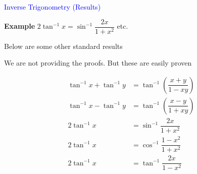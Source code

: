\documentclass[14pt,fleqn]{extarticle}
\begin{document}
\begin{skill}
\begin{narrow}
\textcolor{blue}{Inverse Trigonometry (Results)} 

\small\textbf{Example } $2\tan^{-1} x = \sin^{-1}\dfrac{2x}{1+x^2}$ etc. 
\end{narrow}

\reason 

Below are some other standard
results\newline 

We are not providing the
proofs. But these are easily 
proven

%
\begin{align}
\tan^{-1}x + \tan^{-1}y &= \tan^{-1}\left( \dfrac{x+y}{1-xy}\right) \\
\tan^{-1}x - \tan^{-1}y &= \tan^{-1}\left( \dfrac{x-y}{1+xy}\right) \\
2\tan^{-1} x &= \sin^{-1}\dfrac{2x}{1+x^2} \\
2\tan^{-1} x &= \cos^{-1}\dfrac{1-x^2}{1+x^2} \\
2\tan^{-1} x &= \tan^{-1}\dfrac{2x}{1-x^2} \\
\end{align}

\end{skill}
\end{document}
